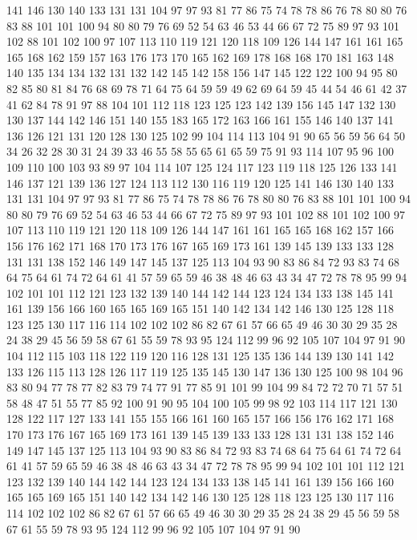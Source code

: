 141 146 130 140 133 131 131 104 97 97 93 81 77 86 75 74 78 78 86 76
78 80 80 76 83 88 101 101 100 94 80 80 79 76 69 52 54 63 46 53
44 66 67 72 75 89 97 93 101 102 88 101 102 100 97 107 113 110 119 121
120 118 109 126 144 147 161 161 165 165 168 162 159 157 163 176 173 170 165 162
169 178 168 168 170 181 163 148 140 135 134 134 132 131 132 142 145 142 158 156
147 145 122 122 100 94 95 80 82 85 80 81 84 76 68 69 78 71 64 75
64 59 59 49 62 69 64 59 45 44 54 46 61 42 37 41 62 84 78 91
97 88 104 101 112 118 123 125 123 142 139 156 145 147 132 130 130 137 144 142
146 151 140 155 183 165 172 163 166 161 155 146 140 137 141 136 126 121 131 120
128 130 125 102 99 104 114 113 104 91 90 65 56 59 56 64 50 34 26 32
28 30 31 24 39 33 46 55 58 55 65 61 65 59 75 91 93 114 107 95
96 100 109 110 100 103 93 89 97 104 114 107 125 124 117 123 119 118 125 126
133 141 146 137 121 139 136 127 124 113 112 130 116 119 120 125 141 146 130 140
133 131 131 104 97 97 93 81 77 86 75 74 78 78 86 76 78 80 80 76
83 88 101 101 100 94 80 80 79 76 69 52 54 63 46 53 44 66 67 72
75 89 97 93 101 102 88 101 102 100 97 107 113 110 119 121 120 118 109 126
144 147 161 161 165 165 168 162 157 166 156 176 162 171 168 170 173 176 167 165
169 173 161 139 145 139 133 133 128 131 131 138 152 146 149 147 145 137 125 113
104 93 90 83 86 84 72 93 83 74 68 64 75 64 61 74 72 64 61 41
57 59 65 59 46 38 48 46 63 43 34 47 72 78 78 95 99 94 102 101
101 112 121 123 132 139 140 144 142 144 123 124 134 133 138 145 141 161 139 156
166 160 165 165 169 165 151 140 142 134 142 146 130 125 128 118 123 125 130 117
116 114 102 102 102 86 82 67 61 57 66 65 49 46 30 30 29 35 28 24
38 29 45 56 59 58 67 61 55 59 78 93 95 124 112 99 96 92 105 107
104 97 91 90 104 112 115 103 118 122 119 120 116 128 131 125 135 136 144 139
130 141 142 133 126 115 113 128 126 117 119 125 135 145 130 147 136 130 125 100
98 104 96 83 80 94 77 78 77 82 83 79 74 77 91 77 85 91 101 99
104 99 84 72 72 70 71 57 51 58 48 47 51 55 77 85 92 100 91 90
95 104 100 105 99 98 92 103 114 117 121 130 128 122 117 127 133 141 155 155
166 161 160 165 157 166 156 176 162 171 168 170 173 176 167 165 169 173 161 139
145 139 133 133 128 131 131 138 152 146 149 147 145 137 125 113 104 93 90 83
86 84 72 93 83 74 68 64 75 64 61 74 72 64 61 41 57 59 65 59
46 38 48 46 63 43 34 47 72 78 78 95 99 94 102 101 101 112 121 123
132 139 140 144 142 144 123 124 134 133 138 145 141 161 139 156 166 160 165 165
169 165 151 140 142 134 142 146 130 125 128 118 123 125 130 117 116 114 102 102
102 86 82 67 61 57 66 65 49 46 30 30 29 35 28 24 38 29 45 56
59 58 67 61 55 59 78 93 95 124 112 99 96 92 105 107 104 97 91 90
